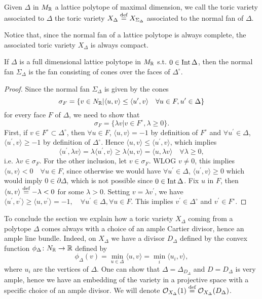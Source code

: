 \documentclass[../main.tex]{subfiles}
\begin{document}
\begin{defn}
    Given $\Delta$ in $M_{\mathbb{R}}$ a lattice polytope of maximal dimension, we call the toric variety associated to $\Delta$ the toric variety $X_\Delta \stackrel{\text{def}}{=} X_{\Sigma_\Delta}$ associated to the normal fan of $\Delta$.
\end{defn} 

Notice that, since the normal fan of a lattice polytope is always complete, the associated toric variety $X_\Delta$ is always compact.

\begin{proposition} \label{normalfan}
    If $\Delta$ is a full dimensional lattice polytope in $M_{\mathbb{R}}$ s.t. $0 \in \operatorname{Int} \Delta$, then the normal fan $\Sigma_\Delta$ is the fan consisting of cones over the faces of $\Delta^\circ$.
\end{proposition} 
\begin{proof}
Since the normal fan $\Sigma_\Delta$ is given by the cones  \[
\sigma_F = \{ v \in N_{\mathbb{R}} | \langle u, v\rangle \leq \langle u^\prime, v \rangle \quad \forall u \in F, u^\prime \in \Delta \}
\]
for every face $F$ of $\Delta$, we need to show that 
\[
\sigma_F = \{ \lambda v | v \in F^\circ, \lambda \geq 0 \}.
\]
First, if $v \in F^\circ \subset \Delta^\circ$, then $\forall u \in F$, $\langle u, v \rangle = -1$ by definition of $F^\circ$ and  $\forall u^\prime \in \Delta$, $\langle u^\prime, v \rangle \geq -1$ by definition of $\Delta^\circ$. Hence $\langle u,v \rangle \leq \langle u^\prime,v \rangle $, which implies
\[
\langle u^\prime , \lambda v \rangle = \lambda \langle u^\prime, v \rangle \geq  \lambda \langle u, v \rangle = \langle  u, \lambda v \rangle \quad \forall\lambda\geq 0,
\]
i.e. $\lambda v \in \sigma_F$.
For the other inclusion, let $v \in \sigma_F$. WLOG $v \neq 0$, this implies $\langle u, v \rangle < 0 \quad \forall u \in F$, since otherwise we would have $\forall u^\prime \in \Delta$, $\langle u^\prime, v \rangle \geq 0$ which would imply $0 \in \partial \Delta$, which is not possible since $0 \in \operatorname{Int} \Delta$.
Fix $u$ in $F$, then $\langle u, v \rangle \stackrel{\text{def}}{=} -\lambda < 0$ for some $\lambda >0$. Setting $v=\lambda v^\prime$, we have $\langle u^\prime, v^\prime \rangle \geq \langle u, v^\prime \rangle = -1 ,\quad \forall u^\prime \in \Delta, \forall u \in F$. This implies $v^\prime \in \Delta^\circ$ and $v^\prime \in F^\circ$.
\end{proof}

To conclude the section we explain how a toric variety $X_\Delta$ coming from a polytope $\Delta$ comes always with a choice of an ample Cartier divisor, hence an ample line bundle. Indeed, on $X_\Delta$ we have a divisor $ D_\Delta$ defined by the convex function $\phi_\Delta \colon N_{\mathbb{R}} \to \mathbb{R}$ defined by
\[
\phi_\Delta(v) = \min_{u \in \Delta} \langle u, v \rangle = \min_i \langle u_i, v \rangle,
\]
where $u_i$ are the vertices of $\Delta$. 
One can show that $\Delta = \Delta_{D_\Delta}$ and $D=D_\Delta$ is very ample, hence we have an embedding of the variety in a projective space with a specific choice of an ample divisor. We will denote $\mathcal{O}_{X_\Delta}(1) \stackrel{\text{def}}{=} \mathcal{O}_{X_\Delta}(D_{\Delta}) $.
\end{document}
